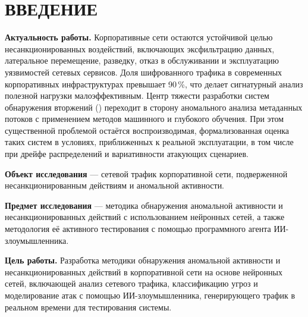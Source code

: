 \section*{ВВЕДЕНИЕ}

\textbf{Актуальность работы.} Корпоративные сети остаются устойчивой
целью несанкционированных воздействий, включающих эксфильтрацию
данных, латеральное перемещение, разведку, отказ в обслуживании и
эксплуатацию уязвимостей сетевых сервисов. Доля шифрованного трафика
в современных корпоративных инфраструктурах превышает 90\,\%, что
делает сигнатурный анализ полезной нагрузки малоэффективным.
Центр тяжести разработки систем обнаружения вторжений
() переходит в сторону
аномального анализа метаданных потоков с применением методов
машинного и глубокого обучения. При этом существенной проблемой
остаётся воспроизводимая, формализованная оценка таких систем в
условиях, приближенных к реальной эксплуатации, в том числе при
дрейфе распределений и вариативности атакующих сценариев.

\textbf{Объект исследования} --- сетевой трафик корпоративной сети,
подверженной несанкционированным действиям и аномальной активности.

\textbf{Предмет исследования} --- методика обнаружения аномальной
активности и несанкционированных действий с использованием нейронных
сетей, а также методология её активного тестирования с помощью
программного агента ИИ-злоумышленника.

\textbf{Цель работы.} Разработка методики обнаружения аномальной
активности и несанкционированных действий в корпоративной сети на
основе нейронных сетей, включающей анализ сетевого трафика,
классификацию угроз и моделирование атак с помощью ИИ-злоумышленника,
генерирующего трафик в реальном времени для тестирования системы.

